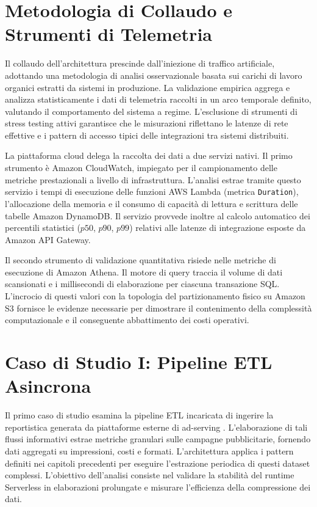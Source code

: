\section{Metodologia di Collaudo e Strumenti di Telemetria}
Il collaudo dell'architettura prescinde dall'iniezione di traffico artificiale, adottando una metodologia di analisi osservazionale basata sui carichi di lavoro organici estratti da sistemi in produzione. La validazione empirica aggrega e analizza statisticamente i dati di telemetria raccolti in un arco temporale definito, valutando il comportamento del sistema a regime. L'esclusione di strumenti di stress testing attivi garantisce che le misurazioni riflettano le latenze di rete effettive e i pattern di accesso tipici delle integrazioni tra sistemi distribuiti.

La piattaforma cloud delega la raccolta dei dati a due servizi nativi. Il primo strumento è Amazon CloudWatch, impiegato per il campionamento delle metriche prestazionali a livello di infrastruttura. L'analisi estrae tramite questo servizio i tempi di esecuzione delle funzioni AWS Lambda (metrica \texttt{Duration}), l'allocazione della memoria e il consumo di capacità di lettura e scrittura delle tabelle Amazon DynamoDB. Il servizio provvede inoltre al calcolo automatico dei percentili statistici ($p50$, $p90$, $p99$) relativi alle latenze di integrazione esposte da Amazon API Gateway.

Il secondo strumento di validazione quantitativa risiede nelle metriche di esecuzione di Amazon Athena. Il motore di query traccia il volume di dati scansionati e i millisecondi di elaborazione per ciascuna transazione SQL. L'incrocio di questi valori con la topologia del partizionamento fisico su Amazon S3 fornisce le evidenze necessarie per dimostrare il contenimento della complessità computazionale e il conseguente abbattimento dei costi operativi.

\section{Caso di Studio I: Pipeline ETL Asincrona}
Il primo caso di studio esamina la pipeline ETL incaricata di ingerire la reportistica generata da piattaforme esterne di ad-serving \cite{GoogleAdManager}. L'elaborazione di tali flussi informativi estrae metriche granulari sulle campagne pubblicitarie, fornendo dati aggregati su impressioni, costi e formati. L'architettura applica i pattern definiti nei capitoli precedenti per eseguire l'estrazione periodica di questi dataset complessi. L'obiettivo dell'analisi consiste nel validare la stabilità del runtime Serverless in elaborazioni prolungate e misurare l'efficienza della compressione dei dati.

